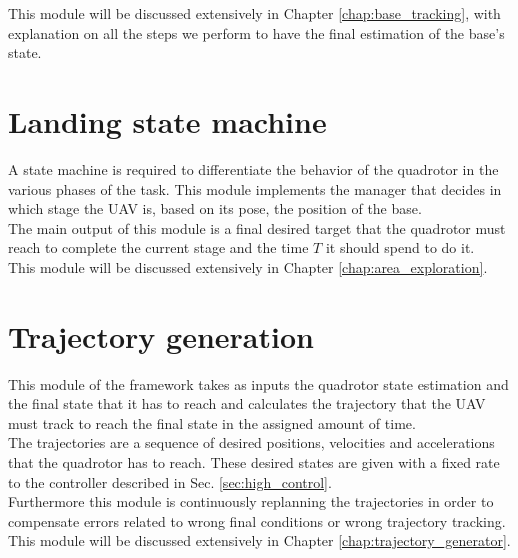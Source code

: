 This module will be discussed extensively in Chapter \ref{chap:base_tracking}, with explanation on all the steps we perform to have the final estimation of the base's state.

\section{Landing state machine} \label{sec:area_exploration}
A state machine is required to differentiate the behavior of the quadrotor in the various phases of the task. This module implements the manager that decides in which stage the UAV is, based on its pose, the position of the base.\\
The main output of this module is a final desired target that the quadrotor must reach to complete the current stage and the time $T$ it should spend to do it.\\

This module will be discussed extensively in Chapter \ref{chap:area_exploration}.


\section{Trajectory generation}
This module of the framework takes as inputs the quadrotor state estimation and the final state that it has to reach and calculates the trajectory that the UAV must track to reach the final state in the assigned amount of time.\\
The trajectories are a sequence of desired positions, velocities and accelerations that the quadrotor has to reach. These desired states are given with a fixed rate to the controller described in Sec. \ref{sec:high_control}.\\
Furthermore this module is continuously replanning the trajectories in order to compensate errors related to wrong final conditions or wrong trajectory tracking.\\  

This module will be discussed extensively in Chapter \ref{chap:trajectory_generator}.
